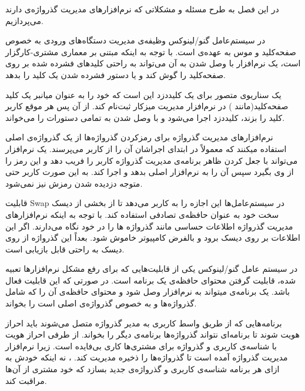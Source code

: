
در این فصل به طرح مسئله و مشکلاتی که نرم‌‌افزارهای مدیریت گذرواژه‌ی دارند می‌پردازیم.


در سیستم‌عامل گنو/لینوکس وظیفه‌ی مدیریت دستگاه‌های ورودی به خصوص صفحه‌کلید و موس به عهده‌ی  است. با توجه به اینکه  مبتنی بر معماری مشتری-کارگزار است، یک نرم‌افزار با وصل شدن به آن می‌تواند به راحتی کلید‌های فشرده شده بر روی صفحه‌کلید را گوش کند و یا دستور فشرده شدن یک کلید را بدهد. 

یک سناریوی متصور برای یک کلیددزد این است که خود را به عنوان میانبر یک کلید صفحه‌کلید(مانند ) در نرم‌افزار مدیریت میزکار ثبت‌نام کند. از آن پس هر موقع کاربر کلید  را بزند، کلیددزد اجرا می‌شود و با وصل شدن به  تمامی دستورات را می‌خواند.


نرم‌افزارهای مدیریت گذرواژه برای رمزکردن گذرواژه‌ها از یک گذرواژه‌ی اصلی استفاده میکنند که معمولاً در ابتدای اجراشان آن را از کاربر می‌پرسند. یک نرم‌افزار می‌تواند با جعل کردن ظاهر برنامه‌ی مدیریت گذرواژه کاربر را فریب دهد و این رمز را از وی بگیرد سپس آن را به نرم‌افزار اصلی بدهد و اجرا کند. به این صورت کاربر حتی متوجه دزدیده شدن رمزش نیز نمی‌شود.


قابلیت Swap در سیستم‌عامل‌ها این اجازه را به کاربر می‌دهد تا از بخشی از دیسک سخت خود به عنوان حافظه‌ی تصادفی استفاده کند. با توجه به اینکه نرم‌افزارهای مدیریت گذرواژه اطلاعات حساسی مانند گذرواژه ها را در خود نگاه می‌دارند. اگر این اطلاعات بر روی دیسک برود و بالفرض کامپیوتر خاموش شود. بعداً این گذرواژه از روی دیسک به راحتی قابل بازیابی است.


در سیستم عامل گنو/لینوکس یکی از قابلیت‌هایی که برای رفع مشکل نرم‌افزارها تعبیه شده، قابلیت گرفتن محتوای حافظه‌ی یک برنامه است. در صورتی که این قابلیت فعال باشد. یک برنامه‌ی  میتواند به نرم‌افزار وصل شود و محتوای حافظه‌ی آن را که شامل گذرواژه‌ها و به خصوص گذرواژه‌ی اصلی است را بخواند.


برنامه‌هایی که از طریق واسط کاربری به مدیر گذرواژه متصل می‌شوند باید احراز هویت شوند تا برنامه‌ای نتواند گذرواژه‌ها برنامه‌ی دیگر را بخواند. از طرفی احراز هویت با شناسه‌ی کاربری و گذرواژه برای مشتری‌ها کاری بی‌فایده است. زیرا نرم‌افزار مدیریت گذرواژه آمده است تا گذرواژه‌ها را ذخیره مدیریت کند. ، نه اینکه خودش به ازای هر برنامه شناسه‌ی کاربری و گذرواژه‌ی جدید بسازد که خود مشتری از آن‌ها مراقبت کند. 
